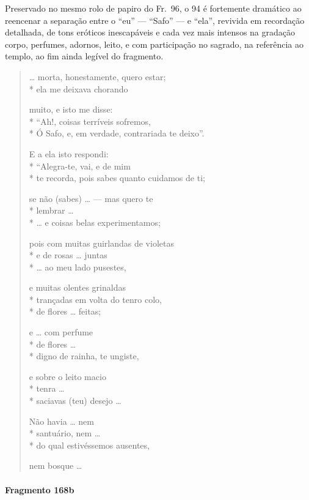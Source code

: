 {\small Preservado no mesmo rolo de papiro do Fr.~96, o 94 é fortemente dramático ao
reencenar a separação entre o “eu” --- ``Safo” --- e “ela”, revivida em
recordação detalhada, de tons eróticos inescapáveis e cada vez mais intensos na
gradação corpo, perfumes, adornos, leito, e com participação no sagrado, na
referência ao templo, ao fim ainda legível do fragmento.}

\begin{verse}
\ldots{} morta, honestamente, quero estar;\\*
ela me deixava chorando

muito, e isto me disse:\\*
“Ah!, coisas terríveis sofremos,\\*
Ó Safo, e, em verdade, contrariada te deixo”.

E a ela isto respondi:\\*
“Alegra-te, vai, e de mim\\*
te recorda, pois sabes quanto cuidamos de ti;

se não (sabes) \ldots{} --- mas quero te\\*
lembrar \ldots{}\\*
\ldots{} e coisas belas experimentamos;

pois com muitas guirlandas de violetas\\*
e de rosas \ldots{} juntas\\*
\ldots{} ao meu lado pusestes,			\EP[]

e muitas olentes grinaldas\\*
trançadas em volta do tenro colo, \\*
de flores \ldots{} feitas;

e \ldots{} com perfume\\*
de flores \ldots{}\\*
digno de rainha, te ungiste,

e sobre o leito macio\\*
tenra \ldots{}\\*
saciavas (teu) desejo \ldots{}

Não havia \ldots{} nem \\*
santuário, nem \ldots{}\\*
do qual estivéssemos ausentes,

nem bosque \ldots{}
\end{verse}


\paragraph{Fragmento 168b}

